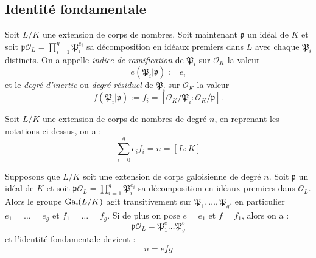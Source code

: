 \documentclass[a4paper]{article} %
\numberwithin{section}{part}
\numberwithin{equation}{section}
\newcommand\EO{\mathcal{O}}
\begin{document}
\subsection{Identité fondamentale}
\begin{defn}
Soit $L/K$ une extension de corps de nombres. Soit maintenant $\mathfrak{p}$ un 
idéal de $K$ et soit $\mathfrak{p}\EO_L = \prod_{i=1}^{g}{\mathfrak{P}_i^{e_i}}$
sa décomposition en idéaux premiers dans $L$ avec chaque $\mathfrak{P}_i$
distincts. On a appelle \emph{indice de ramification} de $\mathfrak{P}_i$ sur 
$\EO_K$ la valeur 
\begin{equation}
e(\mathfrak{P}_i\vert \mathfrak{p}) := e_i
\end{equation}
et le \emph{degré d'inertie} ou \emph{degré résiduel} de $\mathfrak{P}_i$ sur
$\EO_K$ la valeur
\begin{equation}
f(\mathfrak{P}_i\vert \mathfrak{p}) := f_i =
[\EO_K/\mathfrak{P}_i:\EO_K/\mathfrak{p}].
\end{equation}
\end{defn}

\begin{thm}
\label{th:fundid}
Soit $L/K$ une extension de corps de nombres de degré $n$, en reprenant les 
notations ci-dessus, on a :
\begin{equation}
\sum_{i=0}^g{e_if_i} = n = [L:K]
\end{equation}
\end{thm}

\begin{thm}
\label{th:fundidgal}
Supposons que $L/K$ soit une extension de corps galoisienne de degré $n$. Soit
$\mathfrak{p}$ un idéal de $K$ et soit $\mathfrak{p}\EO_L = 
\prod_{i=1}^{g}{\mathfrak{P}_i^{e_i}}$ sa décomposition en idéaux premiers dans
$\EO_L$. Alors le groupe $\textup{Gal}(L/K)$ agit transitivement sur
$\mathfrak{P}_1,\dots,\mathfrak{P}_g$, en particulier $e_1 = \dots = e_g$ et
$f_1 = \dots = f_g$. Si de plus on pose $e = e_1$ et $f = f_1$, alors on a :
\begin{equation}
\mathfrak{p}\EO_L = \mathfrak{P}_1^e\dots\mathfrak{P}_g^e
\end{equation}
et l'identité fondamentale devient :
\begin{equation}
n = efg
\end{equation}
\end{thm}
\end{document}
